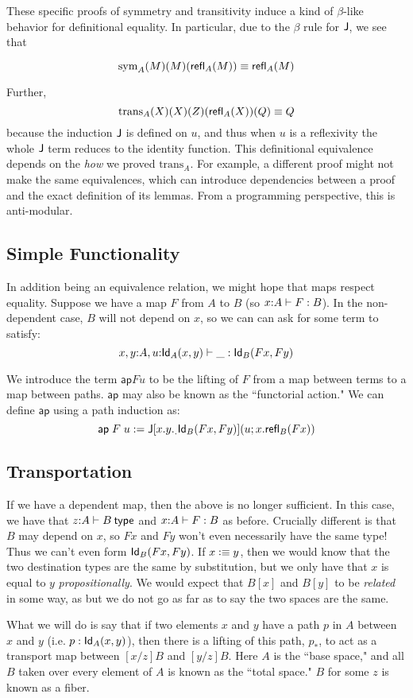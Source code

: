 \documentclass[12pt]{article}
\begin{document}
These specific proofs of symmetry and transitivity induce a kind of $\beta$-like behavior for definitional equality. In particular, due to the $\beta$ rule for $\mathsf{J}$, we see that 

\[\text{sym}_A(M)(M)(\mathsf{refl}_{A}(M)) \equiv \mathsf{refl}_{A}(M)\]

Further,
\[\text{trans}_A(X)(X)(Z)(\mathsf{refl}_{A}(X))(Q) \equiv Q\]
because the induction $\mathsf{J}$ is defined on $u$, and thus when $u$ is a reflexivity the whole $\mathsf{J}$ term reduces to the identity function. This definitional equivalence depends on the \emph{how} we proved $\text{trans}_A$. For example, a different proof might not make the same equivalences, which can introduce dependencies between a proof and the exact definition of its lemmas. From a programming perspective, this is anti-modular.

\subsection{Simple Functionality}
In addition being an equivalence relation, we might hope that maps respect equality. Suppose we have a map $F$ from $A$ to $B$ (so $x{:}A\vdash F:B$). In the non-dependent case, $B$ will not depend on $x$, so we can can ask for some term to satisfy:
\[x,y{:}A, u{:}\mathsf{Id}_{A}(x,y) \vdash \_ : \mathsf{Id}_{B}(F x, F y)\]

We introduce the term $\textsf{ap} F u$ to be the lifting of $F$ from a map between terms to a map between paths. $\textsf{ap}$ may also be known as the ``functorial action." We can define $\textsf{ap}$ using a path induction as:
\[\textsf{ap}\; F\; u := \mathsf{J}[x.y._.\mathsf{Id}_{B}(F x, F y)](u; x. \mathsf{refl}_{B}(F x))\]

\subsection{Transportation}
If we have a dependent map, then the above is no longer sufficient. In this case, we have that $z{:}A\entails B\type$ and $x{:}A\vdash F:B$ as before. Crucially different is that $B$ may depend on $x$, so $F x$ and $F y$ won't even necessarily have the same type! Thus we can't even form $\mathsf{Id}_{B}(F x, F y)$. If $x \vcentcolon\equiv y$, then we would know that the two destination types are the same by substitution, but we only have that $x$ is equal to $y$ \emph{propositionally}. We would expect that $B[x]$ and $B[y]$ to be \emph{related} in some way, as but we do not go as far as to say the two spaces are the same.

What we will do is say that if two elements $x$ and $y$ have a path $p$ in $A$ between $x$ and $y$ (i.e. $p:\mathsf{Id}_{A}(x,y)$), then there is a lifting of this path, $p_*$, to act as a transport map between $[x/z]B$ and $[y/z]B$. Here $A$ is the ``base space," and all $B$ taken over every element of $A$ is known as the ``total space." $B$ for some $z$ is known as a fiber.
\end{document}
